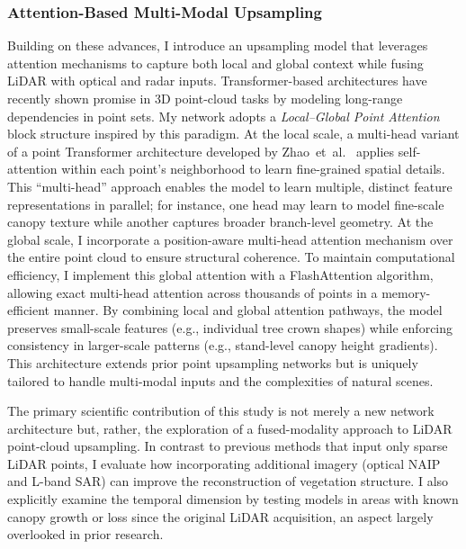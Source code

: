 \documentclass[12pt]{report}
\begin{document}
\subsubsection*{Attention-Based
 Multi-Modal Upsampling}

Building on these advances, I introduce an upsampling model that leverages attention mechanisms to capture both local and global context while fusing LiDAR with optical and radar inputs. Transformer-based architectures have recently shown promise in 3D point-cloud tasks by modeling long-range dependencies in point sets. My network adopts a \emph{Local--Global Point Attention} block structure inspired by this paradigm. At the local scale, a multi-head variant of a point Transformer architecture developed by \mbox{Zhao et al. \citep{zhao2021point}} applies self-attention within each point’s neighborhood to learn fine-grained spatial details. This “multi-head” approach enables the model to learn multiple, distinct feature representations in parallel; for instance, one head may learn to model fine-scale canopy texture while another captures broader branch-level geometry. At the global scale, I incorporate a position-aware multi-head attention mechanism over the entire point cloud to ensure structural coherence. To maintain computational efficiency, I implement this global attention with a FlashAttention \citep{dao2022flashattention} algorithm, allowing exact multi-head attention across thousands of points in a memory-efficient manner. By combining local and global attention pathways, the model preserves small-scale features (e.g., individual tree crown shapes) while enforcing consistency in larger-scale patterns (e.g., stand-level canopy height gradients). This architecture extends prior point upsampling networks but is uniquely tailored to handle multi-modal inputs and the complexities of natural scenes.

The primary scientific contribution of this study is not merely a new network architecture but, rather, the exploration of a fused-modality approach to LiDAR point-cloud upsampling. In contrast to previous methods that input only sparse LiDAR points, I evaluate how incorporating additional imagery (optical NAIP and L-band SAR) can improve the reconstruction of vegetation structure. I also explicitly examine the temporal dimension by testing models in areas with known canopy growth or loss since the original LiDAR acquisition, an aspect largely overlooked in prior research.
\end{document}

